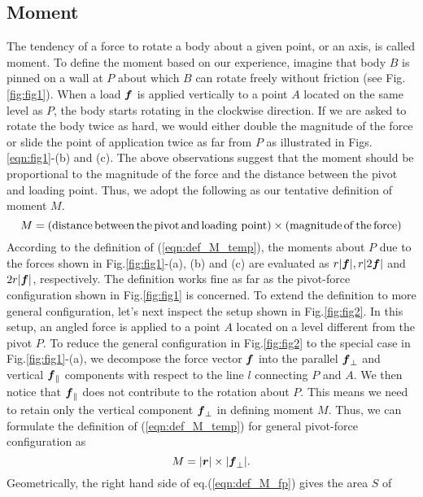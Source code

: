 \documentclass[10pt,a4j]{article}
\begin{document}
\subsection{Moment}
The tendency of a force to rotate a body about a given point, or an axis, is
called moment. To define the moment based on our experience, 
imagine that body $B$ is pinned on a wall at $P$ about which $B$ can rotate freely without 
friction (see Fig.\ref{fig:fig1}). When a load $\mbox{\boldmath $f$}$ is applied vertically to a point $A$ 
located on the same level as $P$, the body starts rotating in the clockwise direction. 
 If we are asked to rotate the body twice as hard, we would either double the magnitude of 
the force or slide the point of application twice as far from $P$ as illustrated in Figs.\ref{eqn:fig1}-(b) and (c). 
The above observations suggest that the moment should be proportional to the magnitude of the force 
and the distance between the pivot and loading point. 
Thus, we adopt the following as our tentative definition of moment $M$.
\begin{equation}
	M=({\rm distance \, between \,the \, pivot\, and\, loading\ point) \times (magnitude \, of \, the \,force)}
	\label{eqn:def_M_temp}
\end{equation}
According to the definition of (\ref{eqn:def_M_temp}), the moments about $P$ due to the 
forces shown in Fig.\ref{fig:fig1}-(a), (b) and (c) are evaluated as $r|\mbox{\boldmath $f$}|, r|2\mbox{\boldmath $f$}|$ 
and $2r|\mbox{\boldmath $f$}|$, respectively. The definition works fine as far as the pivot-force 
configuration shown in Fig.\ref{fig:fig1} is concerned.
To extend the definition to more general configuration, let's next inspect the setup 
shown in Fig.\ref{fig:fig2}. In this setup, an angled force is applied to a point $A$ 
located on a level different from the pivot $P$.
To reduce the general configuration in Fig.\ref{fig:fig2} to the special case 
in Fig.\ref{fig:fig1}-(a), we decompose the force vector $\mbox{\boldmath $f$}$ into the parallel 
$\mbox{\boldmath $f$}_{\perp}$ and vertical $\mbox{\boldmath $f$}_\parallel$ components with respect to the line $l$ 
connecting $P$ and $A$. We then notice that $\mbox{\boldmath $f$}_{\parallel}$ does not contribute to 
the rotation about $P$. This means we need to retain only the vertical component 
$\mbox{\boldmath $f$}_{\perp}$ in defining moment $M$. Thus, we can formulate the definition of (\ref{eqn:def_M_temp}) 
for general pivot-force configuration as 
\begin{equation}
	M=|\mbox{\boldmath $r$}|\times |\mbox{\boldmath $f$}_{\perp}|.
	\label{eqn:def_M_fp}
\end{equation}
Geometrically, the right hand side of eq.(\ref{eqn:def_M_fp}) gives the area $S$ of 
\end{document}
